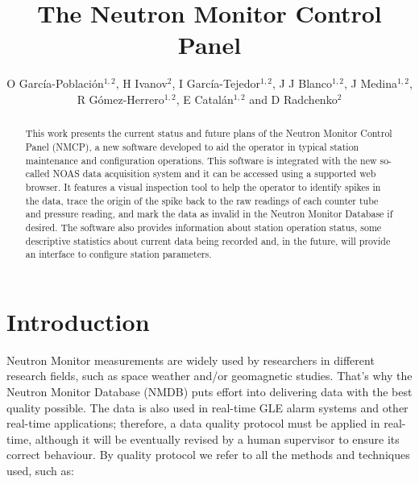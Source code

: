 \documentclass[a4paper]{jpconf}
\begin{document}
\title{The Neutron Monitor Control Panel}

\author{O García-Población$^{1,2}$, H Ivanov$^2$, I García-Tejedor$^{1,2}$,
J J Blanco$^{1,2}$, J Medina$^{1,2}$, R Gómez-Herrero$^{1,2}$, E
Catalán$^{1,2}$ and D Radchenko$^{2}$}

\address{$^1$ Space Research Group, University of Alcalá, Spain}
\address{$^2$ Castilla-La Mancha Neutron Monitor, Parque Tecnológico de Guadalajara, Spain}


\begin{abstract} 

    This work presents the current status and future plans of the Neutron
    Monitor Control Panel (NMCP), a new software developed to aid the operator
    in typical station maintenance and configuration operations. This software
    is integrated with the new so-called NOAS data acquisition system and it
    can be accessed using a supported web browser. It features a visual
    inspection tool to help the operator to identify spikes in the data, trace
    the origin of the spike back to the raw readings of each counter tube and
    pressure reading, and mark the data as invalid in the Neutron Monitor
    Database if desired. The software also provides information about station
    operation status, some descriptive statistics about current data being
    recorded and, in the future, will provide an interface to configure station
    parameters.

\end{abstract}

\section{Introduction}

Neutron Monitor measurements are widely used by researchers in different
research fields, such as space weather and/or geomagnetic studies. That's why
the Neutron Monitor Database (NMDB)\cite{NMDB2011} puts effort into delivering
data with the best quality possible. The data is also used in real-time GLE
alarm systems and other real-time applications; therefore, a data quality
protocol must be applied in real-time, although it will be eventually revised by
a human supervisor to ensure its correct behaviour. By quality protocol we refer
to all the methods and techniques used, such as:
\end{document}
